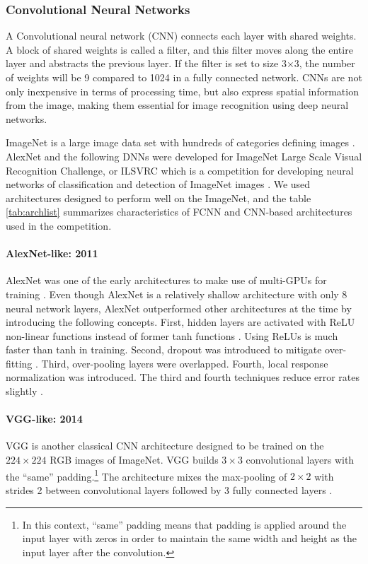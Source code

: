\documentclass{aastex631}
\begin{document}
\subsubsection{Convolutional Neural Networks}
\label{subsubsect:CNN}
A Convolutional neural network (CNN) connects each layer with shared weights. 
A block of shared weights is called a filter, and this filter moves along the entire layer and abstracts the previous layer. 
If the filter is set to size 3$\times$3, the number of weights will be 9 compared to 1024 in a fully connected network. 
CNNs are not only inexpensive in terms of processing time, but also express spatial information from the image, making them essential for image recognition using deep neural networks.

ImageNet is a large image data set with hundreds of categories defining images \citep{2009imagenet_cvpr09}.
AlexNet and the following DNNs were developed for ImageNet Large Scale Visual Recognition Challenge, or ILSVRC which is a competition for developing neural networks of classification and detection of ImageNet images \citep{2014arXiv1409.0575R}.
We used architectures designed to perform well on the ImageNet, and the table \ref{tab:archlist} summarizes characteristics of FCNN and CNN-based architectures used in the competition.

\paragraph{AlexNet-like: 2011}
\label{paragraph:AlexNet}
AlexNet was one of the early architectures to make use of multi-GPUs for training \citep{NIPS2012_c399862d}.
Even though AlexNet is a relatively shallow architecture with only 8 neural network layers, AlexNet outperformed other architectures at the time by introducing the following concepts.
First, hidden layers are activated with ReLU non-linear functions instead of former tanh functions \citep{2018arxivAgarap}.
Using ReLUs is much faster than tanh in training.
Second, dropout was introduced to mitigate over-fitting \citep{srivastava2014dropout}.
Third, over-pooling layers were overlapped.
Fourth, local response normalization was introduced.
The third and fourth techniques reduce error rates slightly \citep{2017arxivWang}.

\paragraph{VGG-like: 2014}
\label{paragraph:VGG}
VGG is another classical CNN architecture designed to be trained on the $224\times224$ RGB images of ImageNet. 
VGG builds $3\times3$ convolutional layers with the ``same'' padding.\footnote{In this context, ``same'' padding means that padding is applied around the input layer with zeros in order to maintain the same width and height as the input layer after the convolution.}
The architecture mixes the max-pooling of $2\times2$ with strides 2 between convolutional layers followed by 3 fully connected layers \citep{2014arxivGraham}.
\end{document}
